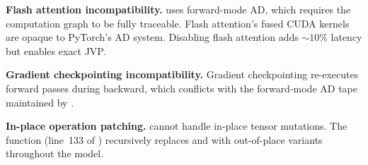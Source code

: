 \textbf{Flash attention incompatibility.}   uses
forward-mode AD, which requires the computation graph to be fully traceable.
Flash attention's fused CUDA kernels are opaque to PyTorch's AD system.
Disabling flash attention adds ${\sim}10\%$ latency but enables exact JVP.

\textbf{Gradient checkpointing incompatibility.}  Gradient checkpointing
re-executes forward passes during backward, which conflicts with the
forward-mode AD tape maintained by .

\textbf{In-place operation patching.}   cannot handle
in-place tensor mutations.  The function  (line~133
of ) recursively replaces 
and  with out-of-place variants throughout the
model.
